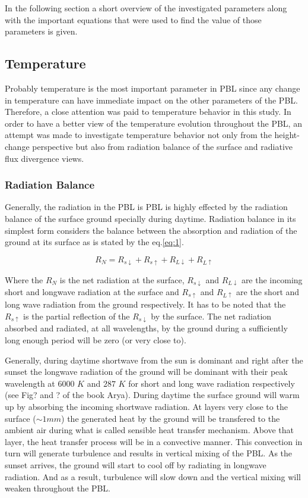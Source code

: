 \documentclass[a4paper,12pt]{article}
\numberwithin{equation}{section} %
\begin{document}
In the following section a short overview of the investigated parameters along with the important equations that were used to find the value of those parameters is given.

\subsection{Temperature}

Probably temperature is the most important parameter in PBL since any change in temperature can have immediate impact on the other parameters of the PBL. Therefore, a close attention was paid to temperature behavior in this study. In order to have a better view of the temperature evolution throughout the PBL, an attempt was made to investigate temperature behavior not only from the height-change perspective but also from radiation balance of the surface and radiative flux divergence views. 

\subsubsection{Radiation Balance}

Generally, the radiation in the PBL is PBL is highly effected by the radiation balance of the surface ground specially during daytime. Radiation balance in its simplest form considers the balance between the absorption and radiation of the ground at its surface as is stated by the eq.\ref{eq:1}.

\vspace{0.25cm}
\begin{equation}
R_N = R_{s\downarrow} + R_{s\uparrow} + R_{L\downarrow} + R_{L\uparrow}
\end{equation}
\vspace{0.25cm}

Where the $R_N$ is the net radiation at the surface, $R_{s\downarrow}$ and $R_{L\downarrow}$ are the incoming short and longwave radiation at the surface and $R_{s\uparrow}$ and $R_{L\uparrow}$ are the short and long wave radiation from the ground respectively. It has to be noted that the $R_{s\uparrow}$ is the partial reflection of the $R_{s\downarrow}$ by the surface. The net radiation absorbed and radiated, at all wavelengths, by the ground during a sufficiently long enough period will be zero (or very close to). 

Generally, during daytime shortwave from the sun is dominant and right after the sunset the longwave radiation of the ground will be dominant with their peak wavelength at $6000$ $K$ and $287$ $K$ for short and long wave radiation respectively (see Fig? and ? of the book Arya). During daytime the surface ground will warm up by absorbing the incoming shortwave radiation. At layers very close to the surface ($\sim 1 mm$) the generated heat by the ground will be transfered to the ambient air during what is called sensible heat transfer mechanism. Above that layer, the heat transfer process will be in a convective manner. This convection in turn will generate turbulence and results in vertical mixing of the PBL. As the sunset arrives, the ground will start to cool off by radiating in longwave radiation. And as a result, turbulence will slow down and the vertical mixing will weaken throughout the PBL.
\end{document}

